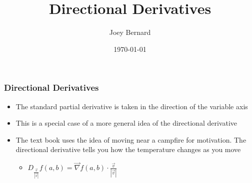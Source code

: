 \documentclass{beamer}
\title{Directional Derivatives}
\author{Joey Bernard}
\institute{University of New Brunswick}
\date{\today}
\begin{document}
\begin{frame}
  \titlepage
\end{frame}

\begin{frame}
  \frametitle{Directional Derivatives}
  \begin{itemize}
  \item The standard partial derivative is taken in the direction of the variable axis
  \item This is a special case of a more general idea of the directional derivative
  \item The text book uses the idea of moving near a campfire for motivation. The directional derivative tells you how the temperature changes as you move
    \begin{itemize}
    \item $D_{\frac{\overrightarrow{v}}{|\overrightarrow{v}|}}f(a,b) = \overrightarrow{\nabla}f(a,b) \cdot \frac{\overrightarrow{v}}{|\overrightarrow{v}|}$
    \end{itemize}
  \end{itemize}
\end{frame}
\end{document}
